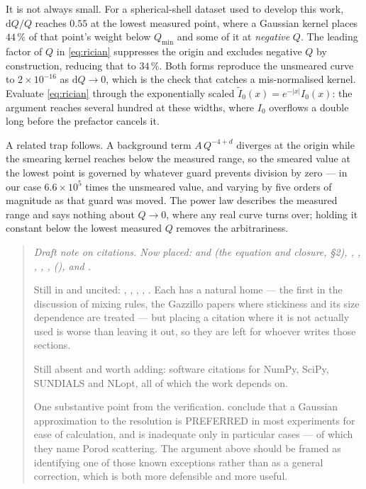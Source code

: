 It is not always small. For a spherical-shell dataset used to develop this
work, $\mathrm{d}Q/Q$ reaches $0.55$ at the lowest measured point, where a
Gaussian kernel places $44\,\%$ of that point's weight below $Q_{\min}$ and
some of it at \emph{negative} $Q$. The leading factor of $Q$ in
\eqref{eq:rician} suppresses the origin and excludes negative $Q$ by
construction, reducing that to $34\,\%$. Both forms reproduce the unsmeared
curve to $2\times10^{-16}$ as $\mathrm{d}Q \to 0$, which is the check that
catches a mis-normalised kernel. Evaluate \eqref{eq:rician} through the
exponentially scaled $\tilde{I}_0(x) = e^{-|x|}I_0(x)$: the argument reaches
several hundred at these widths, where $I_0$ overflows a double long before
the prefactor cancels it.

A related trap follows. A background term $A\,Q^{-4+d}$ diverges at the
origin while the smearing kernel reaches below the measured range, so the
smeared value at the lowest point is governed by whatever guard prevents
division by zero --- in our case $6.6\times10^{5}$ times the unsmeared value,
and varying by five orders of magnitude as that guard was moved. The power
law describes the measured range and says nothing about $Q \to 0$, where any
real curve turns over; holding it constant below the lowest measured $Q$
removes the arbitrariness.

\begin{quote}\small\itshape
Draft note on citations. Now placed:  and
 (the equation and closure, \S2),
, , ,
, , 
(),  and
.

Still in  and uncited: ,
, , ,
. Each has a natural home --- the first in the discussion
of mixing rules, the Gazzillo papers where stickiness and its size
dependence are treated --- but placing a citation where it is not actually
used is worse than leaving it out, so they are left for whoever writes those
sections.

Still absent and worth adding: software citations for NumPy, SciPy, SUNDIALS
and NLopt, all of which the work depends on.

One substantive point from the verification. \citet{BarkerPedersen1995}
conclude that a Gaussian approximation to the resolution is PREFERRED in most
experiments for ease of calculation, and is inadequate only in particular
cases --- of which they name Porod scattering. The argument above should be
framed as identifying one of those known exceptions rather than as a general
correction, which is both more defensible and more useful.
\end{quote}

